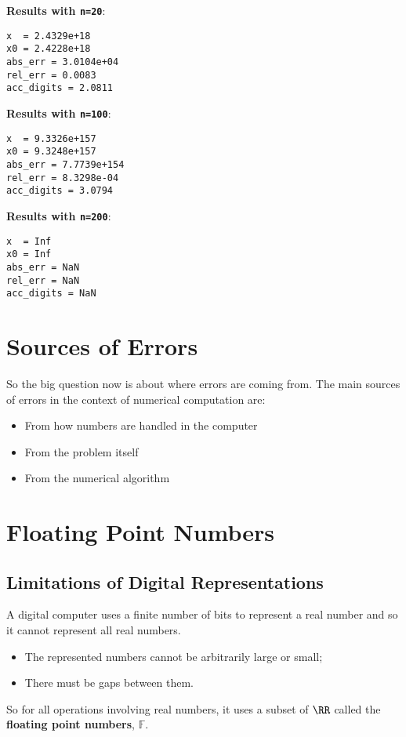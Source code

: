 \documentclass[]{ximera}
\begin{document}
\begingroup\scriptsize
\begin{minipage}{0.31\linewidth}
\textbf{Results with \texttt{n=20}}:
\begin{verbatim}
x  = 2.4329e+18
x0 = 2.4228e+18
abs_err = 3.0104e+04
rel_err = 0.0083
acc_digits = 2.0811
\end{verbatim}
\end{minipage}
\hfill
\begin{minipage}{0.31\linewidth}
\textbf{Results with \texttt{n=100}}:
\begin{verbatim}
x  = 9.3326e+157
x0 = 9.3248e+157
abs_err = 7.7739e+154
rel_err = 8.3298e-04
acc_digits = 3.0794
\end{verbatim}
\end{minipage}
\hfill
\begin{minipage}{0.31\linewidth}
\textbf{Results with \texttt{n=200}}:
\begin{verbatim}
x  = Inf
x0 = Inf
abs_err = NaN
rel_err = NaN
acc_digits = NaN
\end{verbatim}
\end{minipage}
\endgroup

\section{Sources of Errors}
So the big question now is about where errors are coming from. The main sources of errors in the context of numerical computation are:

\begin{itemize}
\item From how numbers are handled in the computer \hfill  {\color{gray}{(floting point numbers)}}
\item From the problem itself \hfill  {\color{gray}{(conditioning)}}
\item From the numerical algorithm \hfill  {\color{gray}{(stability)}}
\end{itemize}

\section{Floating Point Numbers}
\subsection{Limitations of Digital Representations}
A digital computer uses a finite number of bits to represent a real number and so it cannot represent all real numbers.
\begin{itemize}
\item The represented numbers cannot be arbitrarily large or small;
\item There must be gaps between them.
\end{itemize}
So for all operations involving real numbers, it uses a subset of $\RR$ called the \textbf{floating point numbers}, $\mathbb{F}$.
\end{document}
